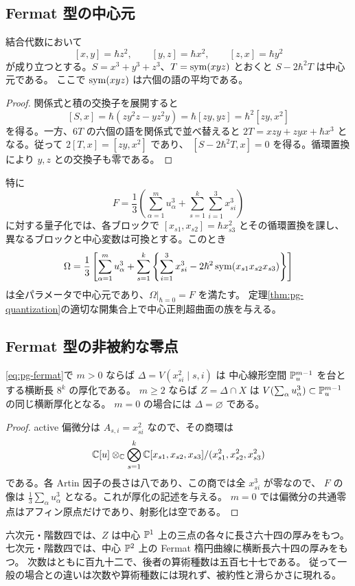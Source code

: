 \subsection{Fermat 型の中心元}
\begin{lemma}\label{lem:pg-fermat-center}
結合代数において
\[
[x,y]=\hbar z^2,\qquad [y,z]=\hbar x^2,\qquad [z,x]=\hbar y^2
\]
が成り立つとする。$S=x^3+y^3+z^3$、$T=\operatorname{sym}(xyz)$ とおくと $S-2\hbar^2T$ は中心元である。
ここで $\operatorname{sym}(xyz)$ は六個の語の平均である。
\end{lemma}
\begin{proof}
関係式と積の交換子を展開すると
\[
[S,x]=\hbar(zy^2z-yz^2y)=\hbar[zy,yz]=\hbar^2[zy,x^2]
\]
を得る。一方、$6T$ の六個の語を関係式で並べ替えると
$2T=xzy+zyx+\hbar x^3$ となる。従って $2[T,x]=[zy,x^2]$ であり、
$[S-2\hbar^2T,x]=0$ を得る。循環置換により $y,z$ との交換子も零である。
\end{proof}
特に
\begin{equation}\label{eq:pg-fermat}
F=\frac13\left(\sum_{\alpha=1}^m u_\alpha^3+
\sum_{s=1}^k\sum_{i=1}^3x_{si}^3\right)
\end{equation}
に対する量子化では、各ブロックで $[x_{s1},x_{s2}]=\hbar x_{s3}^2$ とその循環置換を課し、
異なるブロックと中心変数は可換とする。このとき
\begin{equation}\label{eq:pg-fermat-center}
\Omega=\frac13\left[\sum_{\alpha=1}^m u_\alpha^3+
\sum_{s=1}^k\left\{\sum_{i=1}^3x_{si}^3-2\hbar^2\operatorname{sym}(x_{s1}x_{s2}x_{s3})\right\}\right]
\end{equation}
は全パラメータで中心元であり、$\Omega|_{\hbar=0}=F$ を満たす。
定理\ref{thm:pg-quantization}の適切な開集合上で中心正則超曲面の族を与える。

\subsection{Fermat 型の非被約な零点}
\begin{proposition}\label{prop:pg-fermat-thickening}
\eqref{eq:pg-fermat}で $m>0$ ならば $\Delta=V(x_{si}^2\mid s,i)$ は
中心線形空間 $\mathbb P_u^{m-1}$ を台とする横断長 $8^k$ の厚化である。
$m\geq2$ ならば $Z=\Delta\cap X$ は
$V(\sum_\alpha u_\alpha^3)\subset\mathbb P_u^{m-1}$ の同じ横断厚化となる。
$m=0$ の場合には $\Delta=\varnothing$ である。
\end{proposition}
\begin{proof}
active 偏微分は $A_{s,i}=x_{si}^2$ なので、その商環は
\[
\mathbb C[u]\otimes_\mathbb C\bigotimes_{s=1}^k
\mathbb C[x_{s1},x_{s2},x_{s3}]/(x_{s1}^2,x_{s2}^2,x_{s3}^2)
\]
である。各 Artin 因子の長さは八であり、この商では全 $x_{si}^3$ が零なので、
$F$ の像は $\frac13\sum_\alpha u_\alpha^3$ となる。これが厚化の記述を与える。
$m=0$ では偏微分の共通零点はアフィン原点だけであり、射影化は空である。
\end{proof}
六次元・階数四では、$Z$ は中心 $\mathbb P^1$ 上の三点の各々に長さ六十四の厚みをもつ。
七次元・階数四では、中心 $\mathbb P^2$ 上の Fermat 楕円曲線に横断長六十四の厚みをもつ。
次数はともに百九十二で、後者の算術種数は五百七十七である。
従って一般の場合との違いは次数や算術種数には現れず、被約性と滑らかさに現れる。

